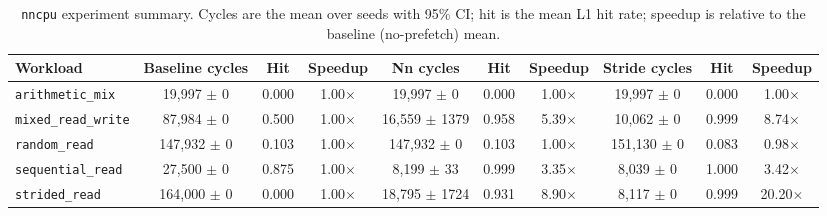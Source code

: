 \begin{table}[t]
  \centering
  \caption{\texttt{nncpu} experiment summary.  Cycles are the
  mean over seeds with 95\% CI; hit is the mean L1 hit rate;
  speedup is relative to the baseline (no-prefetch) mean.
  \label{tab:results}}
  \begin{tabular}{lccccccccc}
    \textbf{Workload} & \textbf{Baseline cycles} & \textbf{Hit} & \textbf{Speedup} & \textbf{Nn cycles} & \textbf{Hit} & \textbf{Speedup} & \textbf{Stride cycles} & \textbf{Hit} & \textbf{Speedup} \\
    \midrule
    \texttt{arithmetic_mix} & 19,997 $\pm$ 0 & 0.000 & 1.00$\times$ & 19,997 $\pm$ 0 & 0.000 & 1.00$\times$ & 19,997 $\pm$ 0 & 0.000 & 1.00$\times$ \\
    \texttt{mixed_read_write} & 87,984 $\pm$ 0 & 0.500 & 1.00$\times$ & 16,559 $\pm$ 1379 & 0.958 & 5.39$\times$ & 10,062 $\pm$ 0 & 0.999 & 8.74$\times$ \\
    \texttt{random_read} & 147,932 $\pm$ 0 & 0.103 & 1.00$\times$ & 147,932 $\pm$ 0 & 0.103 & 1.00$\times$ & 151,130 $\pm$ 0 & 0.083 & 0.98$\times$ \\
    \texttt{sequential_read} & 27,500 $\pm$ 0 & 0.875 & 1.00$\times$ & 8,199 $\pm$ 33 & 0.999 & 3.35$\times$ & 8,039 $\pm$ 0 & 1.000 & 3.42$\times$ \\
    \texttt{strided_read} & 164,000 $\pm$ 0 & 0.000 & 1.00$\times$ & 18,795 $\pm$ 1724 & 0.931 & 8.90$\times$ & 8,117 $\pm$ 0 & 0.999 & 20.20$\times$ \\
    \bottomrule
  \end{tabular}
\end{table}
